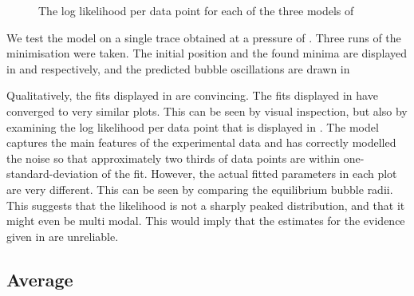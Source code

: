 \begin{figure}[t]%
  \centering
  \subfloat[]{
    \label{fig:plot_bubble_fit_108_150_l:combo}
    }
\caption{The log likelihood per data point for each of the three models of }
\end{figure}



We test the model on a single trace obtained at a pressure of \pOOE.
Three runs of the minimisation were taken.  
The initial position and the found minima are displayed in 
and  respectively,
and the predicted bubble oscillations are drawn in  

Qualitatively, the fits displayed in  are convincing.
The fits displayed in  have converged to very similar plots.
This can be seen by visual inspection,
but also by examining the log likelihood per data point that is displayed in .
The model captures the main features of the experimental data
and has  correctly modelled the  noise so that approximately two thirds of data points are within one-standard-deviation of
the fit.
However, the actual fitted parameters in each plot are very different.
This can be seen  by comparing the equilibrium bubble radii.
This suggests that the likelihood is  not a sharply peaked distribution,
and that it might even be multi modal.
This would imply that the estimates for the evidence given in  are unreliable.




\subsection{Average}

